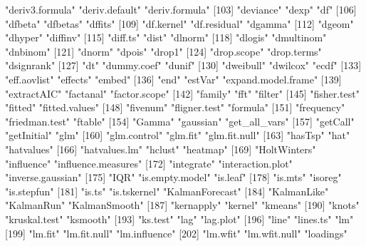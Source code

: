 \begin{Schunk}
\begin{Soutput}
[100] "deriv3.formula"       "deriv.default"        "deriv.formula"       
[103] "deviance"             "dexp"                 "df"                  
[106] "dfbeta"               "dfbetas"              "dffits"              
[109] "df.kernel"            "df.residual"          "dgamma"              
[112] "dgeom"                "dhyper"               "diffinv"             
[115] "diff.ts"              "dist"                 "dlnorm"              
[118] "dlogis"               "dmultinom"            "dnbinom"             
[121] "dnorm"                "dpois"                "drop1"               
[124] "drop.scope"           "drop.terms"           "dsignrank"           
[127] "dt"                   "dummy.coef"           "dunif"               
[130] "dweibull"             "dwilcox"              "ecdf"                
[133] "eff.aovlist"          "effects"              "embed"               
[136] "end"                  "estVar"               "expand.model.frame"  
[139] "extractAIC"           "factanal"             "factor.scope"        
[142] "family"               "fft"                  "filter"              
[145] "fisher.test"          "fitted"               "fitted.values"       
[148] "fivenum"              "fligner.test"         "formula"             
[151] "frequency"            "friedman.test"        "ftable"              
[154] "Gamma"                "gaussian"             "get_all_vars"        
[157] "getCall"              "getInitial"           "glm"                 
[160] "glm.control"          "glm.fit"              "glm.fit.null"        
[163] "hasTsp"               "hat"                  "hatvalues"           
[166] "hatvalues.lm"         "hclust"               "heatmap"             
[169] "HoltWinters"          "influence"            "influence.measures"  
[172] "integrate"            "interaction.plot"     "inverse.gaussian"    
[175] "IQR"                  "is.empty.model"       "is.leaf"             
[178] "is.mts"               "isoreg"               "is.stepfun"          
[181] "is.ts"                "is.tskernel"          "KalmanForecast"      
[184] "KalmanLike"           "KalmanRun"            "KalmanSmooth"        
[187] "kernapply"            "kernel"               "kmeans"              
[190] "knots"                "kruskal.test"         "ksmooth"             
[193] "ks.test"              "lag"                  "lag.plot"            
[196] "line"                 "lines.ts"             "lm"                  
[199] "lm.fit"               "lm.fit.null"          "lm.influence"        
[202] "lm.wfit"              "lm.wfit.null"         "loadings"            

\end{Soutput}
\end{Schunk}
